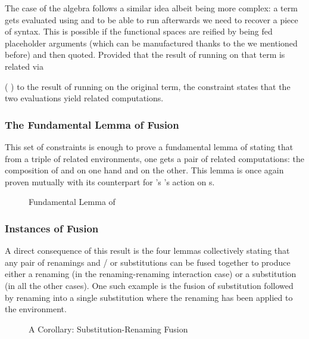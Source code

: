 The case of the algebra follows a similar idea albeit being more complex:
a term gets evaluated using  and to be able to run 
afterwards we need to recover a piece of syntax. This is possible if the
 functional spaces are reified by being fed placeholder  arguments
(which can be manufactured thanks to the  we mentioned before) and
then quoted. Provided that the result of running  on that term is
related via {   (  ) to the result
of running  on the original term, the  constraint states
that the two evaluations yield related computations.


\subsubsection{The Fundamental Lemma of Fusion}

This set of constraints is enough to prove a fundamental lemma of 
stating that from a triple of related environments, one gets a pair of related
computations: the composition of  and  on one hand and
 on the other. This lemma is once again proven mutually with its
counterpart for \semrec{}'s 's action on s.

\begin{figure}[h]
\caption{Fundamental Lemma of }
\end{figure}

\subsubsection{Instances of Fusion}

A direct consequence of this result is the four lemmas collectively stating
that any pair of renamings and / or substitutions can be fused together to
produce either a renaming (in the renaming-renaming interaction case) or a
substitution (in all the other cases). One such example is the fusion of
substitution followed by renaming into a single substitution where the
renaming has been applied to the environment.

\begin{figure}[h]
\caption{A Corollary: Substitution-Renaming Fusion}
\end{figure}

}
